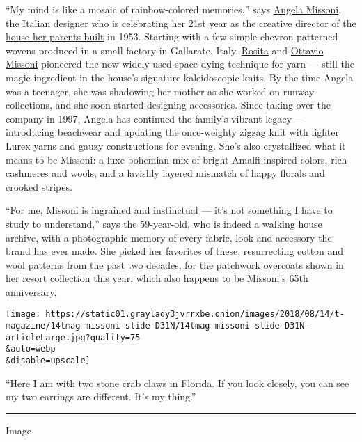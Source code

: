 ``My mind is like a mosaic of rainbow-colored memories,'' says
\href{https://www.nytimes3xbfgragh.onion/2017/09/25/t-magazine/fashion/angela-missoni-milan-fashion-week.html}{Angela
Missoni}, the Italian designer who is celebrating her 21st year as the
creative director of the
\href{https://www.nytimes3xbfgragh.onion/slideshow/2018/02/24/fashion/runway-womens/missoni-m-w-fall-2018.html}{house
her parents built} in 1953. Starting with a few simple chevron-patterned
wovens produced in a small factory in Gallarate, Italy,
\href{https://www.nytimes3xbfgragh.onion/2017/07/11/t-magazine/rosita-missoni-garden-home.html}{Rosita}
and
\href{https://www.nytimes3xbfgragh.onion/2013/05/10/fashion/ottavio-missoni-is-dead-at-92.html}{Ottavio
Missoni} pioneered the now widely used space-dying technique for yarn
--- still the magic ingredient in the house's signature kaleidoscopic
knits. By the time Angela was a teenager, she was shadowing her mother
as she worked on runway collections, and she soon started designing
accessories. Since taking over the company in 1997, Angela has continued
the family's vibrant legacy --- introducing beachwear and updating the
once-weighty zigzag knit with lighter Lurex yarns and gauzy
constructions for evening. She's also crystallized what it means to be
Missoni: a luxe-bohemian mix of bright Amalfi-inspired colors, rich
cashmeres and wools, and a lavishly layered mismatch of happy florals
and crooked stripes.

``For me, Missoni is ingrained and instinctual --- it's not something I
have to study to understand,'' says the 59-year-old, who is indeed a
walking house archive, with a photographic memory of every fabric, look
and accessory the brand has ever made. She picked her favorites of
these, resurrecting cotton and wool patterns from the past two decades,
for the patchwork overcoats shown in her resort collection this year,
which also happens to be Missoni's 65th anniversary.

\texttt{[image: https://static01.graylady3jvrrxbe.onion/images/2018/08/14/t-magazine/14tmag-missoni-slide-D31N/14tmag-missoni-slide-D31N-articleLarge.jpg?quality=75\\\&auto=webp\\\&disable=upscale]}

``Here I am with two stone crab claws in Florida. If you look closely,
you can see my two earrings are different. It's my thing.''

\begin{center}\rule{0.5\linewidth}{\linethickness}\end{center}

Image

